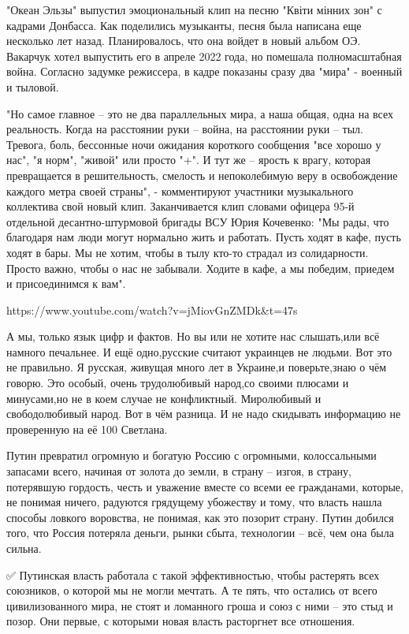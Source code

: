 "Океан Эльзы" выпустил эмоциональный клип на песню "Квіти мінних зон" с кадрами
Донбасса. Как поделились музыканты, песня была написана еще несколько лет
назад. Планировалось, что она войдет в новый альбом ОЭ. Вакарчук хотел
выпустить его в апреле 2022 года, но помешала полномасштабная война. Согласно
задумке режиссера, в кадре показаны сразу два "мира" - военный и тыловой.

"Но самое главное – это не два параллельных мира, а наша общая, одна на всех
реальность. Когда на расстоянии руки – война, на расстоянии руки – тыл.
Тревога, боль, бессонные ночи ожидания короткого сообщения "все хорошо у нас",
"я норм", "живой" или просто "+". И тут же – ярость к врагу, которая
превращается в решительность, смелость и непоколебимую веру в освобождение
каждого метра своей страны", - комментируют участники музыкального коллектива
свой новый клип. Заканчивается клип словами офицера 95-й отдельной
десантно-штурмовой бригады ВСУ Юрия Кочевенко: "Мы рады, что благодаря нам люди
могут нормально жить и работать. Пусть ходят в кафе, пусть ходят в бары. Мы не
хотим, чтобы в тылу кто-то страдал из солидарности. Просто важно, чтобы о нас
не забывали. Ходите в кафе, а мы победим, приедем и присоединимся к вам".

https://www.youtube.com/watch?v=jMiovGnZMDk&t=47s

А мы, только язык цифр и фактов. Но вы или не хотите нас слышать,или всё
намного печальнее. И ещё одно,русские считают украинцев не людьми. Вот это не
правильно. Я русская, живущая много лет в Украине,и поверьте,знаю о чём говорю.
Это особый, очень трудолюбивый народ,со своими плюсами и минусами,но не в коем
случае не конфликтный. Миролюбивый и свободолюбивый народ. Вот в чём разница. И
не надо скидывать информацию не проверенную на её 100%
Светлана.

Путин превратил огромную и богатую Россию с огромными, колоссальными запасами
всего, начиная от золота до земли, в страну – изгоя, в страну, потерявшую
гордость, честь и уважение вместе со всеми ее гражданами, которые, не понимая
ничего, радуются грядущему убожеству и тому, что власть нашла способы ловкого
воровства, не понимая, как это позорит страну. Путин добился того, что Россия
потеряла деньги, рынки сбыта, технологии – всё, чем она была сильна.

✅ Путинская власть работала с такой эффективностью, чтобы растерять всех
союзников, о которой мы не могли мечтать. А те пять, что остались от всего
цивилизованного мира, не стоят и ломанного гроша и союз с ними – это стыд и
позор. Они первые, с которыми новая власть расторгнет все отношения.

